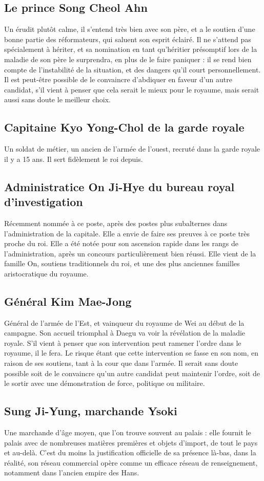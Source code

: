 \documentclass[10pt,a4paper]{book}
\begin{document}
\subsection{Le prince Song Cheol Ahn}
Un érudit plutôt calme, il s'entend très bien avec son père, et a le soutien d'une bonne partie des réformateurs, qui saluent son esprit éclairé. Il ne s'attend pas spécialement à hériter, et sa nomination en tant qu'héritier présomptif lors de la maladie de son père le surprendra, en plus de le faire paniquer : il se rend bien compte de l'instabilité de la situation, et des dangers qu'il court personnellement. Il est peut-être possible de le convaincre d'abdiquer en faveur d'un autre candidat, s'il vient à penser que cela serait le mieux pour le royaume, mais serait aussi sans doute le meilleur choix.
\subsection{Capitaine Kyo Yong-Chol de la garde royale}
Un soldat de métier, un ancien de l'armée de l'ouest, recruté dans la garde royale il y a 15 ans. Il sert fidèlement le roi depuis.
\subsection{Administratice On Ji-Hye du bureau royal d'investigation}
Récemment nommée à ce poste, après des postes plus subalternes dans l'administration de la capitale. Elle a envie de faire ses preuves à ce poste très proche du roi. Elle a été notée pour son ascension rapide dans les rangs de l'administration, après un concours particulièrement bien réussi. Elle vient de la famille On, soutiens traditionnels du roi, et une des plus anciennes familles aristocratique du royaume.
\subsection{Général Kim Mae-Jong}
Général de l'armée de l'Est, et vainqueur du royaume de Wei au début de la campagne. Son accueil triomphal à Daegu va voir la révélation de la maladie royale. S'il vient à penser que son intervention peut ramener l'ordre dans le royaume, il le fera. Le risque étant que cette intervention se fasse en son nom, en raison de ses soutiens, tant à la cour que dans l'armée. Il serait sans doute possible soit de le convaincre qu'un autre candidat peut maintenir l'ordre, soit de le sortir avec une démonstration de force, politique ou militaire.
\subsection{Sung Ji-Yung, marchande Ysoki}
Une marchande d'âge moyen, que l'on trouve souvent au palais : elle fournit le palais avec de nombreuses matières premières et objets d'import, de tout le pays et au-delà. C'est du moins la justification officielle de sa présence là-bas, dans la réalité, son réseau commercial opère comme un efficace réseau de renseignement, notamment dans l'ancien empire des Hans.
\end{document}
